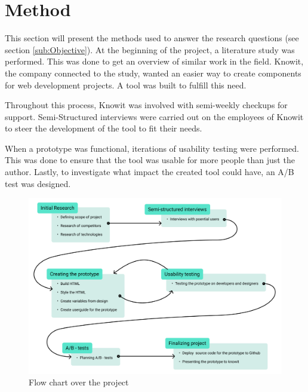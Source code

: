 \section{Method}

This section will present the methods used to answer the research questions (see section \ref{sub:Objective}). At the beginning of the project, a literature study was performed. This was done to get an overview of similar work in the field. Knowit, the company connected to the study, wanted an easier way to create components for web development projects. A tool was built to fulfill this need. 

Throughout this process, Knowit was involved with semi-weekly checkups for support. Semi-Structured interviews were carried out on the employees of Knowit to steer the development of the tool to fit their needs. 

When a prototype was functional, iterations of usability testing were performed. This was done to ensure that the tool was usable for more people than just the author. Lastly, to investigate what impact the created tool could have, an A/B test was designed.


\begin{figure}[H]
  \includegraphics[width=\linewidth]{../images/Project flow chart.png}
  \caption{Flow chart over the project}
  \label{fig:projectFlowChart}
\end{figure}


